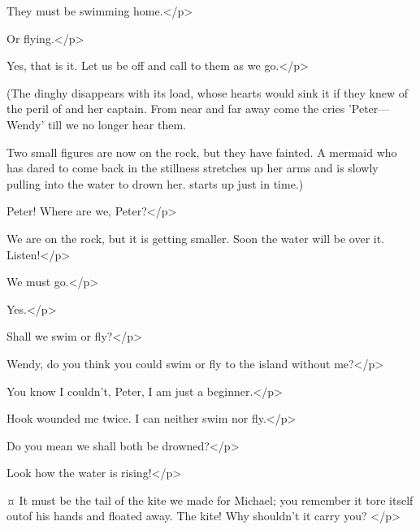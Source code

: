 \begin{drama}
\nibsspeaks
They must be swimming home.</p>

\johnspeaks
Or flying.</p>

\firsttwinspeaks
Yes, that is it.
Let us be off and call to them as we go.</p>

\begin{stagedir}
(The dinghy disappears with its load, whose hearts would sink it if they knew of the peril of \wendy and her captain.
From near and far away come the cries 'Peter—Wendy' till we no longer hear them.

Two small figures are now on the rock, but they have fainted.
A mermaid who has dared to come back in the stillness stretches up her arms
and is slowly pulling \wendy into the water to drown her.
\wendy starts up just in time.)
\end{stagedir}

\wendyspeaks
Peter!
Where are we, Peter?</p>

\peterspeaks
We are on the rock, but it is getting smaller.
Soon the water will be over it.
Listen!</p>


\wendyspeaks
We must go.</p>

\peterspeaks
Yes.</p>

\wendyspeaks
Shall we swim or fly?</p>

\peterspeaks
Wendy, do you think you could swim or fly to the island without me?</p>

\wendyspeaks
You know I couldn't, Peter, I am just a beginner.</p>

\peterspeaks
Hook wounded me twice.
I can neither swim nor fly.</p>

\wendyspeaks
Do you mean we shall both be drowned?</p>

\peterspeaks
Look how the water is rising!</p>


\peterspeaks {}¤
It must be the tail of the kite we made for Michael; you remember it tore itself outof his hands and floated away.
The kite!
Why shouldn't it carry you?
</p>


\end{drama}

